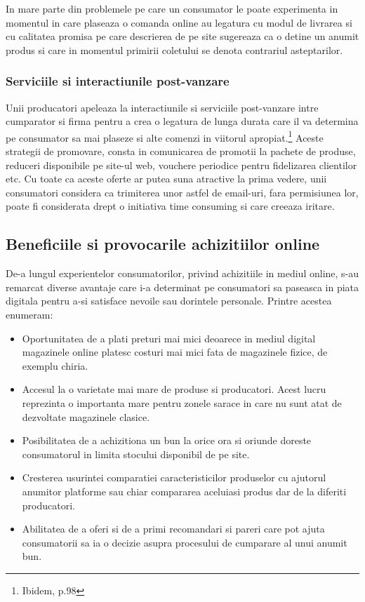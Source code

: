 \documentclass[a4paper, 12pt]{article}
\begin{document}
		\quad In mare parte din problemele pe care un consumator le poate experimenta in momentul in care plaseaza o comanda online au legatura cu  modul de livrarea si cu calitatea promisa pe care descrierea de pe site sugereaza ca o detine un anumit produs si care in momentul primirii coletului se denota contrariul asteptarilor.
		
		\subsubsection{Serviciile si interactiunile post-vanzare}
		
		\quad\quad Unii producatori apeleaza la interactiunile si serviciile post-vanzare intre cumparator si firma pentru a crea o legatura de lunga durata care il va determina pe consumator sa mai plaseze si alte comenzi in viitorul apropiat.\footnote{Ibidem, p.98} Aceste strategii de promovare, consta in comunicarea de promotii la pachete de produse, reduceri disponibile pe site-ul web, vouchere periodice pentru fidelizarea clientilor etc. Cu toate ca aceste oferte ar putea suna atractive la prima vedere, unii consumatori considera ca trimiterea unor astfel de email-uri, fara permisiunea lor, poate fi considerata drept o initiativa time consuming si care creeaza iritare.
		
		
		
		\subsection{Beneficiile si provocarile achizitiilor online}
		
		\quad De-a lungul experientelor consumatorilor, privind achizitiile in mediul online, s-au remarcat diverse avantaje care i-a determinat pe consumatori sa paseasca in piata digitala pentru a-si satisface nevoile sau dorintele personale. Printre acestea enumeram: 
		\begin{itemize}
			\renewcommand{\labelitemi}{$\Rightarrow$}
			\item Oportunitatea de a plati preturi mai mici deoarece in mediul digital magazinele online platesc costuri mai mici fata de magazinele fizice, de exemplu chiria.
			\item  Accesul la o varietate mai mare de produse si producatori. Acest lucru reprezinta o importanta mare pentru zonele sarace in care nu sunt atat de dezvoltate magazinele clasice.
			\item Posibilitatea de a achizitiona un bun la orice ora si oriunde doreste consumatorul in limita stocului disponibil de pe site.
			\item Cresterea usurintei comparatiei caracteristicilor produselor cu ajutorul anumitor platforme sau chiar compararea aceluiasi produs dar de la diferiti producatori.
			\item Abilitatea de a  oferi si de a primi recomandari si pareri care pot ajuta consumatorii sa ia o decizie asupra procesului de cumparare al unui anumit bun.
		\end{itemize}
		
\end{document}
